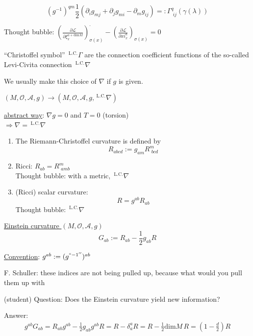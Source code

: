 	\[
	\boxed{ (g^{-1})^{qm}\frac{1}{2} (\partial_i g_{mj} + \partial_j g_{mi} -  \partial_m g_{ij} ) =: \Gamma^q_{ \,\, ij}(\gamma(\lambda))
	}
	\]
	
	Thought bubble: $\left( \frac{ \partial \mathcal{L}}{ \partial \xi_x^{a+\text{dim}M } } \right)^{\cdot}_{\sigma(x)} - \left( \frac{ \partial \mathcal{L}}{ \partial xi^a_x } \right)_{\sigma(x)} = 0$
	
	\begin{definition}
		``Christoffel symbol''   ${\,}^{\text{L.C.}}\Gamma$ are the connection coefficient functions of the so-called Levi-Civita connection ${\,}^{\text{L.C.}}\nabla$
	\end{definition}
	We usually make this choice of $\nabla$ if $g$ is given.  
	
	$(M,\mathcal{O}, \mathcal{A},g) \to (M,\mathcal{O}, \mathcal{A}, g, {\,}^{\text{L.C.}}\nabla)$
	
	\underline{abstract way}: $\nabla g = 0$ and $T=0$ (torsion) \\
	$\Longrightarrow \nabla = {\,}^{\text{L.C.}}\nabla$
	
	
	\begin{definition}
		\begin{enumerate}
			\item[(a)]
			The Riemann-Christoffel curvature is defined by 
			\[
			R_{abcd} := g_{am}R^m_{\,\,bcd}
			\]
			\item[(b)] Ricci: $R_{ab} = R^m_{\,\,amb}$ \\
			Thought bubble: with a metric, ${\,}^{\text{L.C.}}\nabla$
			\item[(c)] (Ricci) scalar curvature:
			\[
			R = g^{ab} R_{ab}
			\]
			Thought bubble: ${\,}^{\text{L.C.}}\nabla$
		\end{enumerate}
	\end{definition}
	
	\begin{definition}
		\underline{ Einstein curvature } $(M,\mathcal{O}, \mathcal{A},g)$
		\[
		G_{ab}:= R_{ab} - \frac{1}{2} g_{ab} R
		\]
	\end{definition}
	
	\underline{Convention}: $g^{ab} := (g^{``-1''})^{ab}$
	
	F. Schuller: these indices are not being pulled up, because what would you pull them up with
	
	(student) Question: Does the Einstein curvature yield new information?
	
	Answer: 
	\[
	\begin{gathered}
	g^{ab} G_{ab} = R_{ab} g^{ab} - \frac{1}{2} g_{ab} g^{ab} R = R - \delta^a_a R = R - \frac{1}{2} \text{dim}M \, R = (1- \frac{d}{2}) R
	\end{gathered}
	\]
	
